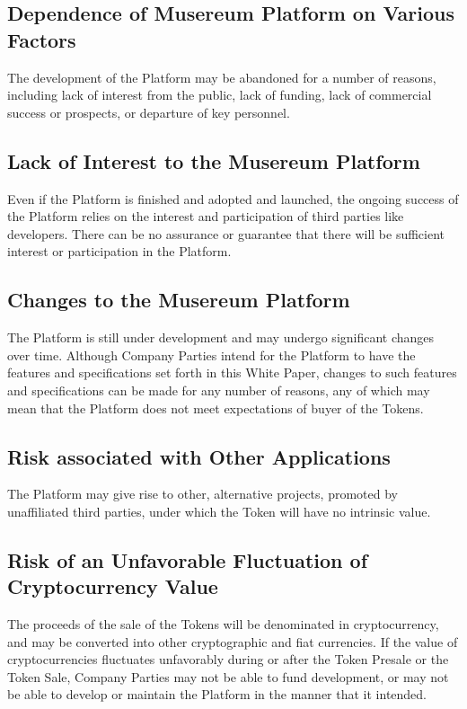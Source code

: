 \documentclass[12pt]{report}
\begin{document}
\begin{multicols}{2}
\subsection{Dependence of Musereum Platform on Various Factors}
The development of the Platform may be abandoned for a number of reasons, including lack of interest from the public, lack of funding, lack of commercial success or prospects, or departure of key personnel.

\subsection{Lack of Interest to the Musereum Platform}
Even if the Platform is finished and adopted and launched, the ongoing success of the Platform relies on the interest and participation of third parties like developers. There can be no assurance or guarantee that there will be sufficient interest or participation in the Platform.

\subsection{Changes to the Musereum Platform}
The Platform is still under development and may undergo significant changes over time. Although Company Parties intend for the Platform to have the features and specifications set forth in this White Paper, changes to such features and specifications can be made for any number of reasons, any of which may mean that the Platform does not meet expectations of buyer of the Tokens.

\subsection{Risk associated with Other Applications}
The Platform may give rise to other, alternative projects, promoted by unaffiliated third parties, under which the Token will have no intrinsic value.

\subsection{Risk of an Unfavorable Fluctuation of Cryptocurrency Value}
The proceeds of the sale of the Tokens will be denominated in cryptocurrency, and may be converted into other cryptographic and fiat currencies. If the value of cryptocurrencies fluctuates unfavorably during or after the Token Presale or the Token Sale, Company Parties may not be able to fund development, or may not be able to develop or maintain the Platform in the manner that it intended.


\end{multicols}
\end{document}
